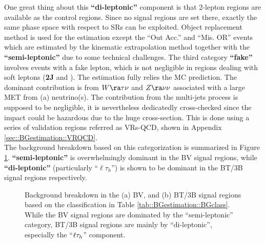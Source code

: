 One great thing about this \textbf{``di-leptonic''} component is that 2-lepton regions are available as the control regions. Since no signal regions are set there, exactly the same phase space with respect to SRs can be exploited. Object replacement method is used for the estimation except the ``Out Acc.'' and ``Mis. OR'' events which are estimated by the kinematic extrapolation method together with the  \textbf{``semi-leptonic''} due to some technical challenges. 
%
The third category \textbf{``fake''} involves events with a fake lepton, which is not negligible in regions dealing with soft leptons (\textbf{2J} and \bLowx). The estimation fully relies the MC prediction. The dominant contribution is from $W\ra\tau\nu$ and $Z\ra\nu\nu$ associated with a large MET from (a) neutrino(s). The contribution from the multi-jets process is supposed to be negligible, it is nevertheless dedicatedly cross-checked since the impact could be hazardous due to the huge cross-section. This is done using a series of validation regions referred as VRs-QCD, shown in Appendix \ref{sec::BGestimation::VRQCD}. \\

The background breakdown based on this categorization is summarized in Figure \ref{fig::BGestimation::BGcomposition_objRep}. \textbf{``semi-leptonic''} is overwhelmingly dominant in the BV signal regions, while \textbf{``di-leptonic''} (particularly ``$\ell\tau_h$'') is shown to be dominant in the BT/3B signal regions respectively.

\clearpage
\begin{figure}[h]
  \centering
    \caption{ Background breakdown in the (a) BV, and (b) BT/3B signal regions based on the classification in Table \ref{tab::BGestimation::BGclass}. While the BV signal regions are dominated by the ``semi-leptonic'' category, BT/3B signal regions are mainly by ``di-leptonic'', especially the ``$\ell\tau_h$'' component.
 \label{fig::BGestimation::BGcomposition_objRep} }
\end{figure}


\clearpage


